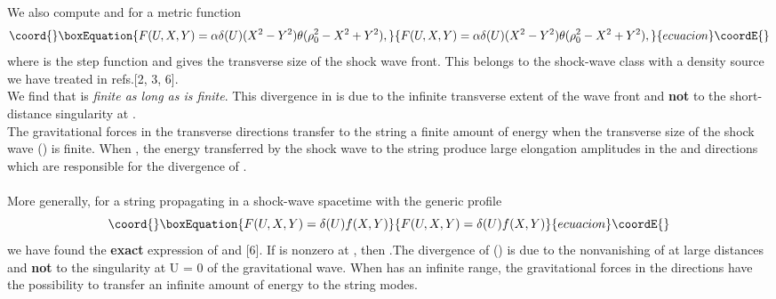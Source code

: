 \documentclass[12pt,a4paper]{article}
\begin{document}
We also compute 
\coordHE{} and \coordHE{} for a metric function 
\begin{equation}\coord{}\boxEquation{
F(U,X,Y) = \alpha \delta (U)(X^2 - Y^2)\theta (\rho^2_0 - X^2 + Y^2), 
}{
F(U,X,Y) = \alpha \delta (U)(X^2 - Y^2)\theta (\rho^2_0 - X^2 + Y^2), 
}{ecuacion}\coordE{}\end{equation}
where \myHighlight{$\theta $}\coordHE{} is the step function and \coordHE{} gives the transverse size 
of the shock wave front. This \coordHE{} belongs to the shock-wave class with a 
density source we have treated in refs.[2, 3, 6].\\ We find that 
\coordHE{} 
is {\it finite as long as \coordHE{} is finite}. This divergence in 
\coordHE{} is due to the infinite transverse extent of the 
wave front and {\bf not} to the short-distance singularity \coordHE{} at 
\coordHE{}.\\ 
The gravitational forces in the transverse directions \coordHE{} 
transfer to the string a finite amount of energy when the transverse size of 
the shock wave (\coordHE{}) is finite. When \coordHE{}, the energy transferred by 
the shock wave to the string produce large elongation amplitudes in the \coordHE{} 
and \coordHE{} directions which are responsible for the divergence of 
\coordHE{}.\\ \\ More generally, for a string propagating in a 
shock-wave spacetime with the generic profile
\begin{equation}\coord{}\boxEquation{
F(U, X, Y) = \delta (U) f (X, Y)
}{
F(U, X, Y) = \delta (U) f (X, Y)
}{ecuacion}\coordE{}\end{equation}
we have found the {\bf exact} expression of \coordHE{} and 
\coordHE{} [6]. If \coordHE{} is nonzero at \coordHE{}, 
then \coordHE{}.The divergence of (\coordHE{}) is due to 
the nonvanishing of 
\coordHE{} at large distances and{ \bf not} to the singularity at 
U = 0 of the gravitational wave. When \coordHE{} has an infinite range, the 
gravitational forces in the \coordHE{} directions have the possibility to 
transfer an infinite amount of energy to the string modes. 
\end{document}
